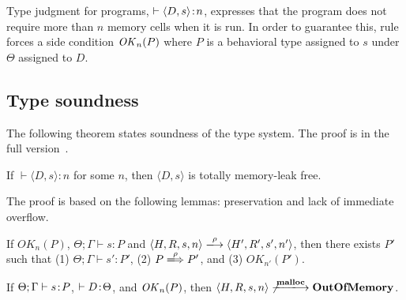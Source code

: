 Type judgment for programs, \(\vdash \langle D, s \rangle \!:\! n\),
expresses that the program does not require more than \(n\) memory
cells when it is run.  In order to guarantee this, rule 
forces a side condition \(\mathit{OK}_n(P)\) where \(P\) is a behavioral type
assigned to \(s\) under \(\Theta\) assigned to \(D\).

\subsection{Type soundness}


The following theorem states soundness of the type system.  The proof
is in the full version~\cite{fullversion}.

\begin{theorem}\label{thm1}
If $\vdash \langle D, s \rangle : n$ for some \(n\), then \(\langle D,
s \rangle\) is totally memory-leak free.
\end{theorem}


The proof is based on the following lemmas: preservation and lack of
immediate overflow.

\begin{lemma}[Preservation]
\label{lem:preservation}
If $OK_{n}(P)$, $\Theta; \Gamma \vdash s : P$ and $\langle H,R,s,n
\rangle \xlongrightarrow{\rho} \langle H',R',s', n' \rangle$, then
there exists $P'$ such that (1) $ \Theta; \Gamma \vdash s' : P'$, (2)
\(P \xLongrightarrow{\rho} P'\), and (3) \(OK_{n'}(P')\).
\end{lemma}


\begin{lemma}
\label{lem:immediateSafety}
If $\Theta; \Gamma \vdash s \!:\! P$, \(\vdash D \!:\! \Theta\), and
\(\mathit{OK}_n(P)\), then $\langle H, R, s, n \rangle
\not\xlongrightarrow{\Malloc} \OVERFLOW$.
\end{lemma}
